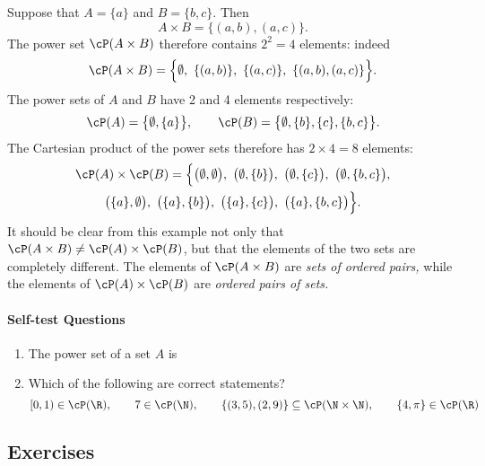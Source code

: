 \begin{example}
Suppose that $A=\{a\}$ and $B=\{b,c\}$. Then
\[A\times B=\{(a,b),(a,c)\}.\]
The power set $\cP(A\times B)$ therefore contains $2^2=4$ elements: indeed
\[\cP(A\times B)=\Big\{\emptyset,\ \{(a,b)\},\ \{(a,c)\},\ \{(a,b),(a,c)\}\Big\}.\]
The power sets of $A$ and $B$ have 2 and 4 elements respectively:
\[\cP(A)=\big\{\emptyset,\{a\}\big\},\qquad\cP(B)=\big\{\emptyset,\{b\},\{c\},\{b,c\}\big\}.\]
The Cartesian product of the power sets therefore has $2\times 4=8$ elements:
\begin{multline*}
\cP(A)\times\cP(B)
=\Big\{\big(\emptyset,\emptyset\big),\  \big(\emptyset,\{b\}\big),\  \big(\emptyset,\{c\}\big),\  \big(\emptyset,\{b,c\}\big),\\*
\big(\{a\},\emptyset\big),\  \big(\{a\},\{b\}\big),\  \big(\{a\},\{c\}\big),\  \big(\{a\},\{b,c\}\big)\Big\}.
\end{multline*}
It should be clear from this example not only that $\cP(A\times B)\neq\cP(A)\times\cP(B)$, but that the elements of the two sets are completely different. The elements of $\cP(A\times B)$ are \emph{sets of ordered pairs,} while the elements of $\cP(A)\times\cP(B)$ are \emph{ordered pairs of sets.}
\end{example}



\paragraph{Self-test Questions}

	\begin{enumerate}
    \item The power set of a set $A$ is \underline{\phantom{the set of all subsets of $A$\qquad\qquad\qquad}}
    \item Which of the following are correct statements?
    \[[0,1)\in\cP(\R),\qquad 7\in\cP(\N),\qquad \{(3,5),(2,9)\}\subseteq\cP(\N\times\N),\qquad \{4,\pi\}\in\cP(\R)\]
  \end{enumerate}


\subsection*{Exercises}

